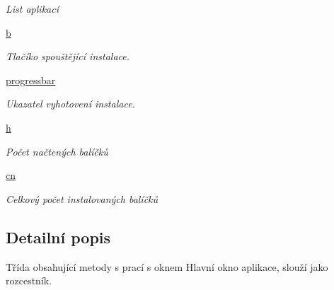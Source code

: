 \begin{DoxyCompactItemize}
\begin{DoxyCompactList}\small\item\em List aplikací \end{DoxyCompactList}\item 
\hypertarget{classmnFocus_1_1App_adaafedf80722dbc5b43480b07fbfb5f9}{\hyperlink{classmnFocus_1_1App_adaafedf80722dbc5b43480b07fbfb5f9}{b}}\label{db/d36/classmnFocus_1_1App_adaafedf80722dbc5b43480b07fbfb5f9}

\begin{DoxyCompactList}\small\item\em Tlačíko spouštějící instalace. \end{DoxyCompactList}\item 
\hypertarget{classmnFocus_1_1App_a5bb738352b2df761b6315f8e400ac1f0}{\hyperlink{classmnFocus_1_1App_a5bb738352b2df761b6315f8e400ac1f0}{progressbar}}\label{db/d36/classmnFocus_1_1App_a5bb738352b2df761b6315f8e400ac1f0}

\begin{DoxyCompactList}\small\item\em Ukazatel vyhotovení instalace. \end{DoxyCompactList}\item 
\hypertarget{classmnFocus_1_1App_a894b544a9d4fca1c75b7f16b44d8a33e}{\hyperlink{classmnFocus_1_1App_a894b544a9d4fca1c75b7f16b44d8a33e}{h}}\label{db/d36/classmnFocus_1_1App_a894b544a9d4fca1c75b7f16b44d8a33e}

\begin{DoxyCompactList}\small\item\em Počet načtených balíčků \end{DoxyCompactList}\item 
\hypertarget{classmnFocus_1_1App_a6c2b18044b5b0d3bda8a1326490e93bc}{\hyperlink{classmnFocus_1_1App_a6c2b18044b5b0d3bda8a1326490e93bc}{cn}}\label{db/d36/classmnFocus_1_1App_a6c2b18044b5b0d3bda8a1326490e93bc}

\begin{DoxyCompactList}\small\item\em Celkový počet instalovaných balíčků \end{DoxyCompactList}\end{DoxyCompactItemize}


\subsection{Detailní popis}
Třída obsahující metody s prací s oknem Hlavní okno aplikace, slouží jako rozcestník. 

